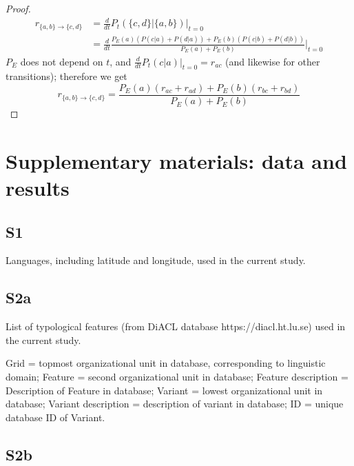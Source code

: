 \documentclass[12pt]{article}
\begin{document}
\begin{appendices}
\begin{proof}
\begin{align*}
    r_{\{a,b\} \rightarrow \{c,d\}} & = \frac{d}{dt} P_t(\{c,d\}|\{a,b\})\Bigr|_{t=0}\\
     & = \frac{d}{dt}\frac{P_E(a)(P(c|a) + P(d|a)) + P_E(b)(P(c|b) + P(d|b))}{P_E(a) + P_E(b)}\Bigr|_{t=0}
\end{align*}
$P_E$ does not depend on $t$, and $\frac{d}{dt}P_t(c|a)\Bigr|_{t=0} = r_{ac}$ (and likewise for other transitions); therefore we get
$$
r_{\{a,b\} \rightarrow \{c,d\}} = \frac{P_E(a)(r_{ac} + r_{ad}) + P_E(b)(r_{bc} + r_{bd})}{P_E(a) + P_E(b)}
$$

\end{proof}





\end{appendices}

\pagebreak

\pagestyle{empty}


\section*{Supplementary materials: data and results}

\subsection*{S1}
Languages, including latitude and longitude, used in the current study.



\pagebreak

\subsection*{S2a}

List of typological features (from DiACL database https://diacl.ht.lu.se) used in the current study.

Grid = topmost organizational unit in database, corresponding to linguistic domain; Feature = second organizational unit in database; Feature description = Description of Feature in database; Variant = lowest organizational unit in database; Variant description = description of variant in database; ID = unique database ID of Variant.



\pagebreak

\subsection*{S2b}
\end{document}
